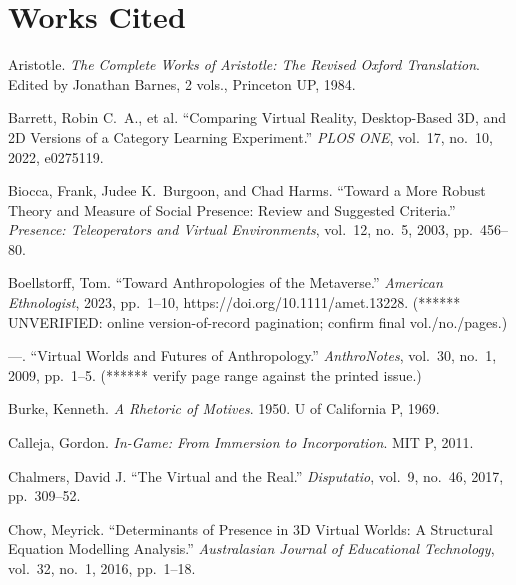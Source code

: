 \documentclass{article}
\newenvironment{workscited}
  {\section*{Works Cited}\begin{list}{}
    {\setlength{\itemindent}{-0.5in}\setlength{\leftmargin}{0.5in}
     \setlength{\itemsep}{0pt}\setlength{\parsep}{6pt}}}
  {\end{list}}
\begin{document}
\begin{workscited}

\item Aristotle. \textit{The Complete Works of Aristotle: The Revised
Oxford Translation}. Edited by Jonathan Barnes, 2 vols., Princeton UP,
1984. %

\item Barrett, Robin C.\ A., et al. ``Comparing Virtual Reality,
Desktop-Based 3D, and 2D Versions of a Category Learning Experiment.''
\textit{PLOS ONE}, vol.~17, no.~10, 2022, e0275119. %

\item Biocca, Frank, Judee K.\ Burgoon, and Chad Harms. ``Toward a More
Robust Theory and Measure of Social Presence: Review and Suggested
Criteria.'' \textit{Presence: Teleoperators and Virtual Environments},
vol.~12, no.~5, 2003, pp.~456--80. %

\item Boellstorff, Tom. ``Toward Anthropologies of the Metaverse.''
\textit{American Ethnologist}, 2023, pp.~1--10,
https://doi.org/10.1111/amet.13228. (****** UNVERIFIED: online
version-of-record pagination; confirm final vol./no./pages.)

\item ---. ``Virtual Worlds and Futures of Anthropology.''
\textit{AnthroNotes}, vol.~30, no.~1, 2009, pp.~1--5. (****** verify page
range against the printed issue.)

\item Burke, Kenneth. \textit{A Rhetoric of Motives}. 1950. U of
California P, 1969. %

\item Calleja, Gordon. \textit{In-Game: From Immersion to Incorporation}.
MIT P, 2011. %

\item Chalmers, David J. ``The Virtual and the Real.''
\textit{Disputatio}, vol.~9, no.~46, 2017, pp.~309--52.

\item Chow, Meyrick. ``Determinants of Presence in 3D Virtual Worlds: A
Structural Equation Modelling Analysis.'' \textit{Australasian Journal of
Educational Technology}, vol.~32, no.~1, 2016, pp.~1--18.


\end{workscited}
\end{document}
